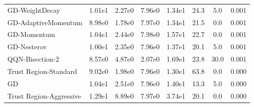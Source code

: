 \documentclass{article}
\begin{document}
\begin{table}[htbp]
{\begin{tabular}{p{2.5cm}*{7}{c}}
GD-WeightDecay & 1.01e1 & 2.27e0 & 7.96e0 & 1.34e1 & 24.3 & 5.0 & 0.001 \\
GD-AdaptiveMomentum & 8.98e0 & 1.78e0 & 7.97e0 & 1.34e1 & 21.5 & 0.0 & 0.001 \\
GD-Momentum & 1.04e1 & 2.44e0 & 7.98e0 & 1.57e1 & 22.7 & 0.0 & 0.001 \\
GD-Nesterov & 1.00e1 & 2.35e0 & 7.96e0 & 1.37e1 & 20.1 & 5.0 & 0.001 \\
QQN-Bisection-2 & 8.57e0 & 4.87e0 & 2.07e0 & 1.69e1 & 23.8 & 30.0 & 0.001 \\
Trust Region-Standard & 9.02e0 & 1.98e0 & 7.96e0 & 1.30e1 & 63.8 & 0.0 & 0.000 \\
GD & 1.04e1 & 2.51e0 & 7.96e0 & 1.40e1 & 13.3 & 5.0 & 0.000 \\
Trust Region-Aggressive & 1.29e1 & 8.89e0 & 7.97e0 & 3.74e1 & 20.1 & 0.0 & 0.000 \\
\bottomrule
\end{tabular}
}
\end{table}
\end{document}
